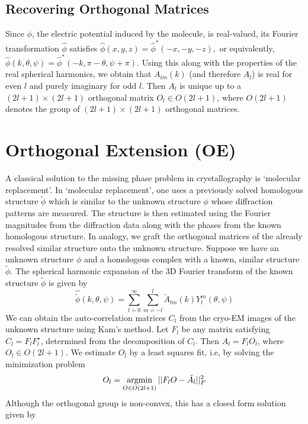 \documentclass{article}
\newcommand{\argmin}{\operatornamewithlimits{argmin}}
\begin{document}
\subsection{Recovering Orthogonal Matrices}
Since $\phi$, the electric potential induced by the molecule, is
real-valued, its Fourier transformation $\hat{\phi}$ satisfies
$ \hat{\phi}(x,y,z)=\hat{\phi}^*(-x,-y,-z),$ or equivalently,
$\hat{\phi}(k,\theta,\psi)=\hat{\phi}^*(-k,\pi-\theta,\psi+\pi).$
Using this along with the properties of the real spherical harmonics, we obtain that
$A_{lm}(k)$ (and therefore $A_l$) is real for even
$l$ and purely imaginary for odd $l$. Then $A_l$ is unique up to a
$(2l+1)\times (2l+1)$ orthogonal matrix $O_l\in O(2l+1)$, where $O(2l+1)$
denotes the group of $(2l+1) \times (2l+1)$ orthogonal matrices.
\section{Orthogonal Extension (OE)}
A classical solution to the missing phase problem in crystallography is
`molecular replacement'. In `molecular replacement', one uses a previously solved
homologous structure $\tilde{\phi}$ which is similar to the unknown structure $\phi$ whose
diffraction patterns are measured. The structure is then estimated using the Fourier
magnitudes from the diffraction data along with the phases from the known homologous
structure. In analogy, we graft the
orthogonal matrices of the already resolved
similar structure onto the unknown structure. Suppose we have an unknown structure $\phi$ and a homologous complex with a
known, similar structure $\tilde \phi$. The spherical harmonic expansion
of the 3D Fourier transform of the known structure $\tilde \phi$ is given by
\begin{equation}
\hat{\tilde \phi}(k,\theta,\psi) = \sum_{l=0}^{\infty} \sum_{m=-l}^{l}
\tilde{A}_{lm}(k) Y_l^m (\theta, \psi)
\end{equation}
We can obtain the auto-correlation matrices $C_l$ from the cryo-EM images of the
unknown structure using Kam's method.
Let $F_l$ be any matrix satisfying $C_l= F_l F_l^\star$, determined from the
decomposition of $C_l$. Then $A_l = F_l O_l$, where $O_l \in O(2l+1)$. We estimate $O_l$ by a 
least squares fit, i.e, by solving the minimization problem
\begin{equation}\label{ls}
O_l=\argmin_{O \in O(2l+1)}  ||F_l O - \tilde{A_l}||_F^2
\end{equation}
Although the orthogonal group is non-convex, this has a closed form solution given by
\end{document}
